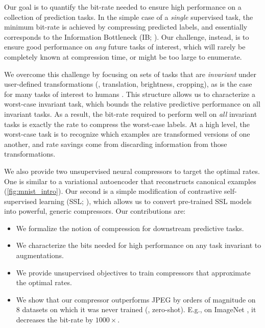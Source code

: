 \documentclass[final]{article}
\begin{document}
Our goal is to quantify the bit-rate needed to ensure high performance on a collection of prediction tasks.
In the simple case of a \emph{single} supervised task, the minimum bit-rate is achieved by compressing predicted labels, and essentially corresponds to the Information Bottleneck (IB; \cite{tishby_information_2000}).
Our challenge, instead, is to ensure good performance on \emph{any} future tasks of interest, which will rarely be completely known at compression time, or might be too large to enumerate.


We overcome this challenge by focusing on sets of tasks that are \textit{invariant} under user-defined transformations (\eg, translation, brightness, cropping), as is the case for many tasks of interest to humans \cite{heaton_ian_2018,shorten_survey_2019}.
This structure allows us to characterize a worst-case invariant task, which bounds the relative predictive performance on all invariant tasks.
As a result, the bit-rate required to perform well on \textit{all} invariant tasks is exactly the rate to compress the worst-case labels.
At a high level, the worst-case task is to recognize which examples are transformed versions of one another, and rate savings come from discarding information from those transformations. 

We also provide two unsupervised neural compressors to target the optimal rates.
One is similar to a variational autoencoder \cite{kingma_auto-encoding_2014} that reconstructs canonical examples (\cref{fig:mnist_intro}).
Our second is a simple modification of contrastive self-supervised learning (SSL; \cite{oord_representation_2019}), which allows us to convert pre-trained SSL models into powerful, generic compressors.
Our contributions are:
\begin{itemize}[noitemsep,leftmargin=*]
\item We formalize the notion of compression for downstream predictive tasks.
\item We characterize the bits needed for high performance on any task invariant to augmentations.
\item We provide unsupervised objectives to train compressors that approximate the optimal rates.
\item We show that our compressor outperforms JPEG by orders of magnitude on 8 datasets on which it was never trained (\ie, zero-shot).
E.g., on ImageNet \cite{deng_imagenet_2009}, it decreases the bit-rate by $1000\times$.
\end{itemize}
\end{document}
